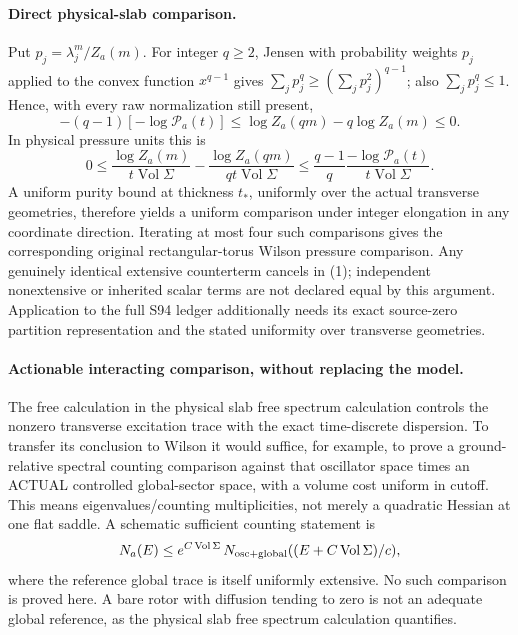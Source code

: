 \documentclass{article}
\begin{document}
\paragraph{Direct physical-slab comparison.}
Put $p_j=\lambda_j^m/Z_a(m)$. For integer $q\ge2$, Jensen with probability weights $p_j$ applied to the convex function $x^{q-1}$ gives
$\sum_jp_j^q\ge(\sum_jp_j^2)^{q-1}$; also $\sum_jp_j^q\le1$. Hence, with every raw normalization still present,
\[
 -(q-1)[-\log\mathcal P_a(t)]\le
 \log Z_a(qm)-q\log Z_a(m)\le0.                         \tag{1}
\]
In physical pressure units this is
\[
 0\le\frac{\log Z_a(m)}{t\operatorname{Vol}\Sigma}
 -\frac{\log Z_a(qm)}{qt\operatorname{Vol}\Sigma}
 \le\frac{q-1}{q}\frac{-\log\mathcal P_a(t)}{t\operatorname{Vol}\Sigma}. \tag{2}
\]
A uniform purity bound at thickness $t_*$, uniformly over the actual transverse geometries, therefore yields a uniform comparison under integer elongation in any coordinate direction. Iterating at most four such comparisons gives the corresponding original rectangular-torus Wilson pressure comparison. Any genuinely identical extensive counterterm cancels in (1); independent nonextensive or inherited scalar terms are not declared equal by this argument. Application to the full S94 ledger additionally needs its exact source-zero partition representation and the stated uniformity over transverse geometries.

\paragraph{Actionable interacting comparison, without replacing the model.}
The free calculation in the physical slab free spectrum calculation controls the nonzero transverse excitation trace with the exact time-discrete dispersion. To transfer its conclusion to Wilson it would suffice, for example, to prove a ground-relative spectral counting comparison against that oscillator space times an ACTUAL controlled global-sector space, with a volume cost uniform in cutoff. This means eigenvalues/counting multiplicities, not merely a quadratic Hessian at one flat saddle. A schematic sufficient counting statement is
\[
 N_a(E)\le e^{C\operatorname{Vol}\Sigma}\,
 N_{\rm osc+global}((E+C\operatorname{Vol}\Sigma)/c),
\]
where the reference global trace is itself uniformly extensive. No such comparison is proved here. A bare rotor with diffusion tending to zero is not an adequate global reference, as the physical slab free spectrum calculation quantifies.
\end{document}
